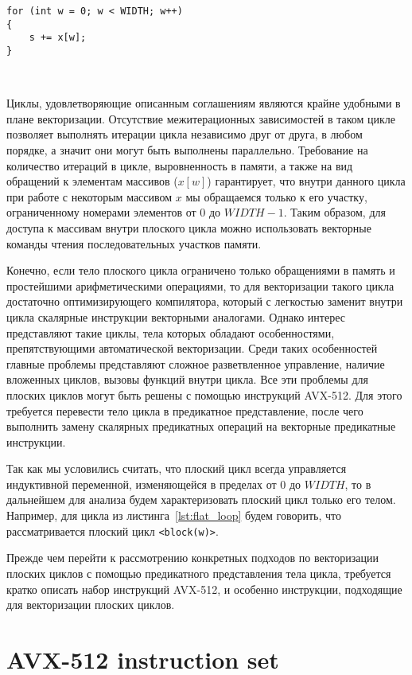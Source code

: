 \documentclass[
11pt,%
tightenlines,%
twoside,%
onecolumn,%
nofloats,%
nobibnotes,%
nofootinbib,%
superscriptaddress,%
noshowpacs,%
centertags]%
{revtex4}
\begin{document}
\begin{lstlisting}[caption={Простейший пример неплоского цикла.},label={lst:not_flat_loop}]
for (int w = 0; w < WIDTH; w++)
{
    s += x[w];
}
\end{lstlisting}

\

Циклы, удовлетворяющие описанным соглашениям являются крайне удобными в плане векторизации.
Отсутствие межитерационных зависимостей в таком цикле позволяет выполнять итерации цикла независимо друг от друга, в любом порядке, а значит они могут быть выполнены параллельно.
Требование на количество итераций в цикле, выровненность в памяти, а также на вид обращений к элементам массивов ($x[w]$) гарантирует, что внутри данного цикла при работе с некоторым массивом $x$ мы обращаемся только к его участку, ограниченному номерами элементов от $0$ до $WIDTH - 1$.
Таким образом, для доступа к массивам внутри плоского цикла можно использовать векторные команды чтения последовательных участков памяти.

Конечно, если тело плоского цикла ограничено только обращениями в память и простейшими арифметическими операциями, то для векторизации такого цикла достаточно оптимизирующего компилятора, который с легкостью заменит внутри цикла скалярные инструкции векторными аналогами.
Однако интерес представляют такие циклы, тела которых обладают особенностями, препятствующими автоматической векторизации.
Среди таких особенностей главные проблемы представляют сложное разветвленное управление, наличие вложенных циклов, вызовы функций внутри цикла.
Все эти проблемы для плоских циклов могут быть решены с помощью инструкций AVX-512.
Для этого требуется перевести тело цикла в предикатное представление, после чего выполнить замену скалярных предикатных операций на векторные предикатные инструкции.

Так как мы условились считать, что плоский цикл всегда управляется индуктивной переменной, изменяющейся в пределах от $0$ до $WIDTH$, то в дальнейшем для анализа будем характеризовать плоский цикл только его телом.
Например, для цикла из листинга~\ref{lst:flat_loop} будем говорить, что рассматривается плоский цикл \texttt{<block(w)>}.

Прежде чем перейти к рассмотрению конкретных подходов по векторизации плоских циклов с помощью предикатного представления тела цикла, требуется кратко описать набор инструкций AVX-512, и особенно инструкции, подходящие для векторизации плоских циклов.

\section{AVX-512 instruction set}
\end{document}
